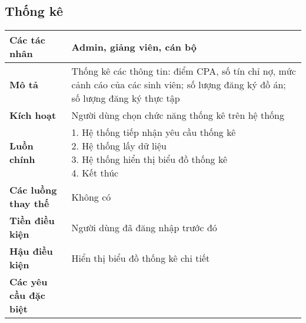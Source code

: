 \subsection{Thống kê}
\begin{tabular}{|l|p{}|}
	\hline
	\textbf{Các tác nhân}         & Admin, giảng viên, cán bộ                                                                                           \\
	\hline
	\textbf{Mô tả}                & Thống kê các thông tin: điểm CPA, số tín chỉ nợ, mức cảnh cáo của các sinh viên; số lượng đăng ký đồ án; số lượng đăng ký thực tập \\
	\hline
	\textbf{Kích hoạt}            & Người dùng chọn chức năng thống kê trên hệ thống                                                                                   \\
	\hline
	\textbf{Luồn chính}           & \makecell[l]{1. Hệ thống tiếp nhận yêu cầu thống kê                                                                                \\ 2. Hệ thống lấy dữ liệu \\ 3. Hệ thống hiển thị biểu đồ thống kê \\ 4. Kết thúc} \\
	\hline
	\textbf{Các luồng thay thế}   & Không có                                                                                                                           \\
	\hline
	\textbf{Tiền điều kiện}       & Người dùng đã đăng nhập trước đó                                                                                                   \\
	\hline
	\textbf{Hậu điều kiện}        & Hiển thị biểu đồ thống kê chi tiết                                                                                                 \\
	\hline
	\textbf{Các yêu cầu đặc biệt} &                                                                                                                                    \\
	\hline
\end{tabular}

